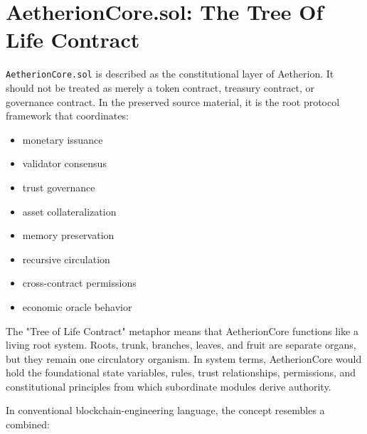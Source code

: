 ﻿\documentclass[12pt]{article}
\begin{document}
\section{AetherionCore.sol: The Tree Of Life Contract}


\texttt{AetherionCore.sol} is described as the constitutional layer of Aetherion. It should not be treated as merely a token contract, treasury contract, or governance contract. In the preserved source material, it is the root protocol framework that coordinates:

\begin{itemize}
  \item monetary issuance
\end{itemize}
\begin{itemize}
  \item validator consensus
\end{itemize}
\begin{itemize}
  \item trust governance
\end{itemize}
\begin{itemize}
  \item asset collateralization
\end{itemize}
\begin{itemize}
  \item memory preservation
\end{itemize}
\begin{itemize}
  \item recursive circulation
\end{itemize}
\begin{itemize}
  \item cross-contract permissions
\end{itemize}
\begin{itemize}
  \item economic oracle behavior
\end{itemize}

The "Tree of Life Contract" metaphor means that AetherionCore functions like a living root system. Roots, trunk, branches, leaves, and fruit are separate organs, but they remain one circulatory organism. In system terms, AetherionCore would hold the foundational state variables, rules, trust relationships, permissions, and constitutional principles from which subordinate modules derive authority.

In conventional blockchain-engineering language, the concept resembles a combined:
\end{document}
